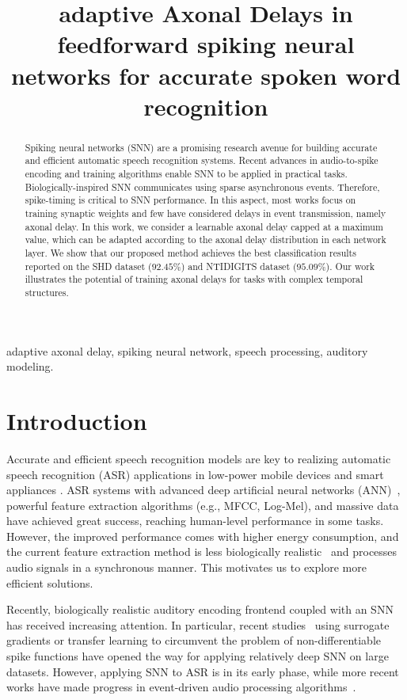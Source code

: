 \documentclass{article}
\title{
adaptive Axonal Delays 
in  feedforward spiking neural networks for accurate spoken word recognition}
\begin{document}
\maketitle
\begin{abstract}
Spiking neural networks (SNN) are a promising research avenue for building accurate and efficient automatic speech recognition systems. Recent advances in audio-to-spike encoding and training algorithms enable SNN to be applied in practical tasks. Biologically-inspired SNN communicates using sparse asynchronous events. Therefore, spike-timing is critical to SNN performance. In this aspect, most works focus on training synaptic weights and few have considered delays in event transmission, namely axonal delay. In this work, we consider a learnable axonal delay capped at a maximum value, which can be adapted according to the axonal delay distribution in each network layer. We show that our proposed method achieves the best classification results reported on the SHD dataset ($92.45$\%) and NTIDIGITS dataset ($95.09$\%). Our work illustrates the potential of training axonal delays for tasks with complex temporal structures.
\end{abstract}



\begin{keywords}
adaptive axonal delay, spiking neural network, speech processing, auditory modeling. 
\end{keywords}
\section{Introduction}
Accurate and efficient speech recognition models are key to realizing automatic speech recognition (ASR) applications in low-power mobile devices and smart appliances \cite{gopalakrishnan2020hfnet}. ASR systems with advanced deep artificial neural networks (ANN)~\cite{ graves2013speech}, powerful feature extraction algorithms (e.g., MFCC, Log-Mel), and massive data have achieved great success, reaching human-level performance in some tasks. However, the improved performance comes with higher energy consumption, and the current feature extraction method is less biologically realistic~\cite{baby2021convolutional} and processes audio signals in a synchronous manner. This motivates us to explore more efficient solutions. 

Recently, biologically realistic auditory encoding frontend \cite{Wu2018, pan2020efficient, wu2018spiking} coupled with an SNN has received increasing attention. In particular, recent studies~\cite{Neftci2019, Shrestha2018, zhang2021rectified} using surrogate gradients or transfer learning \cite{wu2021tandem,wu2021progressive,yang2022training} to circumvent the problem of non-differentiable spike functions have opened the way for applying relatively deep SNN on large datasets. However, applying SNN to ASR is in its early phase, while more recent works have made progress in event-driven audio processing algorithms~\cite{wu2019robust, wu2020deep, 10.1007/978-981-10-5230-9_57, Blouw2020,yilmaz2020deep, zhang2019mpd}.
\end{document}
